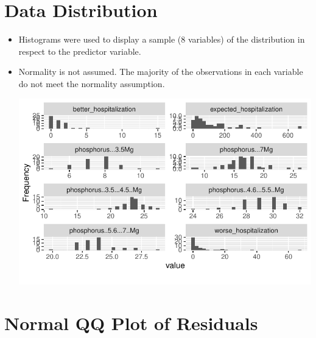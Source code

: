\documentclass[
  letterpaper,
  DIV=11,
  numbers=noendperiod]{scrreprt}
\begin{document}
\hypertarget{data-distribution}{%
\section{Data Distribution}\label{data-distribution}}

\begin{itemize}
\item
  Histograms were used to display a sample (8 variables) of the
  distribution in respect to the predictor variable.
\item
  Normality is not assumed. The majority of the observations in each
  variable do not meet the normality assumption.

  \includegraphics{dataset_files/figure-pdf/unnamed-chunk-7-1.pdf}
\end{itemize}

\hypertarget{normal-qq-plot-of-residuals}{%
\section{Normal QQ Plot of
Residuals}\label{normal-qq-plot-of-residuals}}
\end{document}
